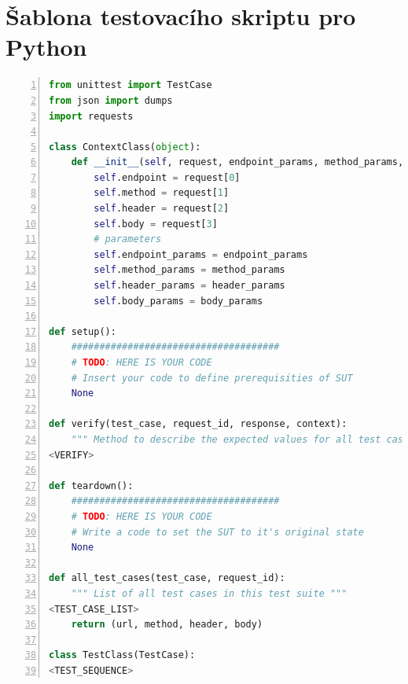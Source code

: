 





\chapter{Šablona testovacího skriptu pro Python}
\label{cahp_sablona}


\begin{lstlisting}[language=Python, basicstyle=\ttfamily\scriptsize,numbers=left,xleftmargin=2em,frame=single]
from unittest import TestCase
from json import dumps
import requests

class ContextClass(object):
    def __init__(self, request, endpoint_params, method_params, header_params, body_params):
        self.endpoint = request[0]
        self.method = request[1]
        self.header = request[2]
        self.body = request[3]
        # parameters
        self.endpoint_params = endpoint_params
        self.method_params = method_params
        self.header_params = header_params
        self.body_params = body_params

def setup():
    #####################################
    # TODO: HERE IS YOUR CODE
    # Insert your code to define prerequisities of SUT
    None

def verify(test_case, request_id, response, context):
    """ Method to describe the expected values for all test cases """
<VERIFY>    
    
def teardown():
    #####################################
    # TODO: HERE IS YOUR CODE
    # Write a code to set the SUT to it's original state
    None

def all_test_cases(test_case, request_id):
    """ List of all test cases in this test suite """
<TEST_CASE_LIST>
    return (url, method, header, body)

class TestClass(TestCase): 
<TEST_SEQUENCE>
\end{lstlisting}


